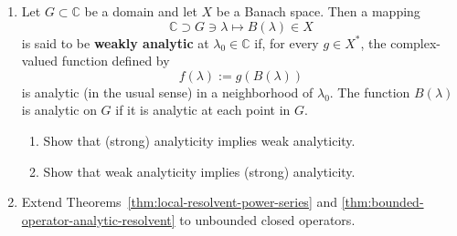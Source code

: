 \begin{enumerate}[label=\thesection.\arabic*.,ref=\thesection.\arabic*,start=17,series=book-problems]
\item\label{ex:weak-and-strong-banach-valued-analyticity} Let $G\subset\mathbb{C}$ be a domain and let $X$ be a Banach space. Then a mapping
\begin{equation}\label{eq:weakly-analytic-banach-valued-map}
\mathbb{C}\supset G\ni\lambda\mapsto B(\lambda)\in X
\end{equation}
is said to be \textbf{weakly analytic} at $\lambda_0\in\mathbb{C}$ if, for every $g\in X^*$, the complex-valued function defined by
\begin{equation}\label{eq:weakly-analytic-scalar-functional-composition}
f(\lambda):=g(B(\lambda))
\end{equation}
is analytic (in the usual sense) in a neighborhood of $\lambda_0$. The function $B(\lambda)$ is analytic on $G$ if it is analytic at each point in $G$.\begin{enumerate}[label=(\alph*)]\item Show that (strong) analyticity implies weak analyticity.\item Show that weak analyticity implies (strong) analyticity.\end{enumerate}

\item\label{ex:closed-unbounded-resolvent-analyticity} Extend Theorems~\ref{thm:local-resolvent-power-series} and \ref{thm:bounded-operator-analytic-resolvent} to unbounded closed operators.

\end{enumerate}
